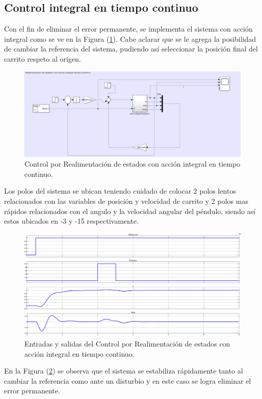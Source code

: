 \subsection{Control integral en tiempo continuo}
Con el fin de eliminar el error permanente, se implementa el sistema con acción integral como se ve en la Figura (\ref{fig:integralFeed}). Cabe aclarar que se le agrega la posibilidad de cambiar la referencia del sistema, pudiendo así seleccionar la posición final del carrito respeto al origen.
\begin{figure}[H]
	\centering
	\includegraphics[width=0.8\linewidth]{ImagenesRealimentacióndeEstados/integralFeed}
	\caption{Control por Realimentación de estados con acción integral en tiempo continuo.}	
	\label{fig:integralFeed}
\end{figure}

Los polos del sistema se ubican teniendo cuidado de colocar 2 polos lentos relacionados con las variables de posición y velocidad de carrito y 2 polos mas rápidos relacionados con el angulo y la velocidad angular del péndulo, siendo así estos ubicados en -3 y -15 respectivamente. 

\begin{figure}[H]
	\centering
	\includegraphics[width=0.8\linewidth]{ImagenesRealimentacióndeEstados/integralFeedOut}
	\caption{Entradas y salidas del Control por Realimentación de estados con acción integral en tiempo continuo.}	
	\label{fig:integralFeedOut}
\end{figure}

En la Figura (\ref{fig:integralFeedOut}) se observa que el sistema se estabiliza rápidamente tanto al cambiar la referencia como ante un disturbio y en este caso se logra eliminar el error permanente.

